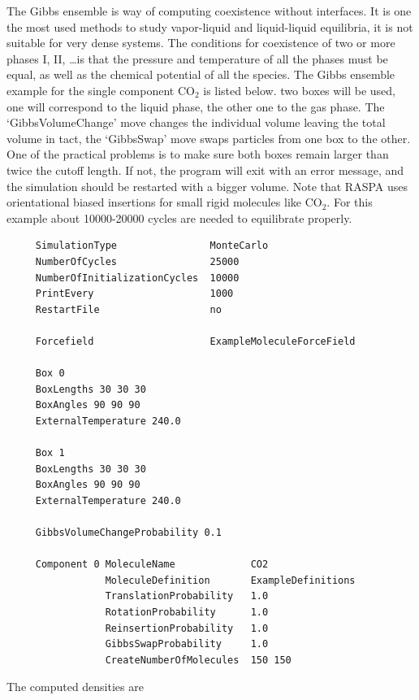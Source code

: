 The Gibbs ensemble is way of computing coexistence without interfaces. It is one the most used methods
to study vapor-liquid and liquid-liquid equilibria, it is not suitable for very dense systems. The 
conditions for coexistence of two or more phases I, II, \dots is that the pressure and temperature 
of all the phases must be equal, as well as the chemical potential of all the species. The Gibbs
ensemble example for the single component CO$_2$ is listed below. two boxes will be used, one will
correspond to the liquid phase, the other one to the gas phase. The `GibbsVolumeChange' move
changes the individual volume leaving the total volume in tact, the `GibbsSwap' move
swaps particles from one box to the other. One of the practical problems is to make sure both
boxes remain larger than twice the cutoff length. If not, the program will exit with an error message,
and the simulation should be restarted with a bigger volume. 
Note that RASPA uses orientational biased insertions for small rigid molecules like CO$_2$.
For this example about 10000-20000 cycles are needed to equilibrate properly.
\begin{tiny}
\begin{verbatim}
     SimulationType                MonteCarlo
     NumberOfCycles                25000
     NumberOfInitializationCycles  10000
     PrintEvery                    1000
     RestartFile                   no
     
     Forcefield                    ExampleMoleculeForceField
     
     Box 0
     BoxLengths 30 30 30
     BoxAngles 90 90 90
     ExternalTemperature 240.0
     
     Box 1
     BoxLengths 30 30 30
     BoxAngles 90 90 90
     ExternalTemperature 240.0
     
     GibbsVolumeChangeProbability 0.1
     
     Component 0 MoleculeName             CO2
                 MoleculeDefinition       ExampleDefinitions
                 TranslationProbability   1.0
                 RotationProbability      1.0
                 ReinsertionProbability   1.0
                 GibbsSwapProbability     1.0
                 CreateNumberOfMolecules  150 150
\end{verbatim}
\end{tiny}
The computed densities are
